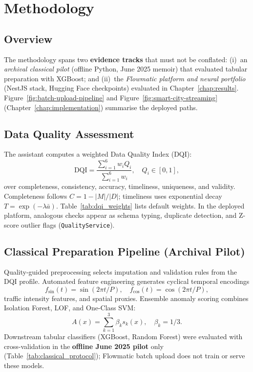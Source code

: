 %
%

\chapter{Methodology}
\label{chap:methodology}

\section{Overview}

The methodology spans two \textbf{evidence tracks} that must not be conflated: (i)~an \emph{archival classical pilot} (offline Python, June 2025 memoir) that evaluated tabular preparation with XGBoost; and (ii)~the \emph{Flowmatic platform and neural portfolio} (NestJS stack, Hugging Face checkpoints) evaluated in Chapter~\ref{chap:results}. Figure~\ref{fig:batch-upload-pipeline} and Figure~\ref{fig:smart-city-streaming} (Chapter~\ref{chap:implementation}) summarise the deployed paths.

\section{Data Quality Assessment}

The assistant computes a weighted Data Quality Index (DQI):
\begin{equation}
\label{eq:dqi}
\mathrm{DQI} = \frac{\sum_{i=1}^{6} w_i Q_i}{\sum_{i=1}^{6} w_i}, \quad Q_i \in [0,1],
\end{equation}
over completeness, consistency, accuracy, timeliness, uniqueness, and validity. Completeness follows $C = 1 - |M|/|D|$; timeliness uses exponential decay $T = \exp(-\lambda \bar{a})$. Table~\ref{tab:dqi_weights} lists default weights. In the deployed platform, analogous checks appear as schema typing, duplicate detection, and Z-score outlier flags (\texttt{QualityService}).



\section{Classical Preparation Pipeline (Archival Pilot)}

Quality-guided preprocessing selects imputation and validation rules from the DQI profile. Automated feature engineering generates cyclical temporal encodings
\begin{equation}
f_{\sin}(t) = \sin(2\pi t/P), \quad f_{\cos}(t) = \cos(2\pi t/P),
\end{equation}
traffic intensity features, and spatial proxies. Ensemble anomaly scoring combines Isolation Forest, LOF, and One-Class SVM:
\begin{equation}
A(x) = \sum_{k=1}^{3} \beta_k s_k(x), \quad \beta_k = 1/3.
\end{equation}
Downstream tabular classifiers (XGBoost, Random Forest) were evaluated with cross-validation in the \textbf{offline June 2025 pilot} only (Table~\ref{tab:classical_protocol}); Flowmatic batch upload does not train or serve these models.

